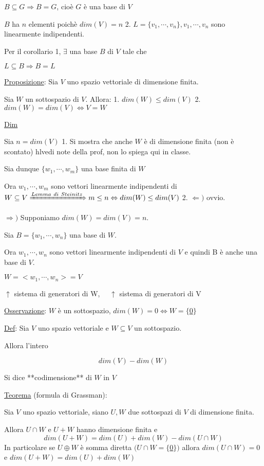 \documentclass{article}
\begin{document}
    $B\subseteq G\Rightarrow B=G$, cioè $G$ è una base di $V$

    $B$ ha $n$ elementi poichè $dim(V)=n$
2. $L=\{v_1,\cdots,v_n\},v_1,\cdots,v_n$ sono linearmente indipendenti.

    Per il corollario 1, $\exists$ una base $B$ di $V$ tale che

    $L\subseteq B\Rightarrow B=L$

\ul{Proposizione}: Sia $V$ uno spazio vettoriale di dimensione finita.

Sia $W$ un sottospazio di $V$. Allora:
1. $dim(W)\le dim(V)$
2. $dim(W)=dim(V)\Leftrightarrow V=W$

\ul{Dim}

Sia $n=dim(V)$
1. Si mostra che anche $W$ è di dimensione finita (non è scontato) hl{vedi note della prof, non lo spiega qui in classe}.

    Sia dunque $\{w_1,\cdots,w_m\}$ una base finita di $W$

    Ora $w_1,\cdots,w_m$ sono vettori linearmente indipendenti di $W\subseteq V\xRightarrow{Lemma\ di\ Steinitz}m\le n\Leftrightarrow dim(W)\le dim(V)$
2. $\Leftarrow)$ ovvio.

    $\Rightarrow)$ Supponiamo $dim(W)=dim(V)=n$.

    Sia $B=\{w_1,\cdots,w_n\}$ una base di $W$.

    Ora $w_1,\cdots,w_n$ sono vettori linearmente indipendenti di $V$ e quindi B è anche una base di $V$.

    $W=<w_1,\cdots,w_n>=V$

    $\uparrow$ sistema di generatori di W, $\quad\uparrow$ sistema di generatori di V

\ul{Osservazione}: $W$ è un sottospazio, $dim(W)=0\Leftrightarrow W=\{$\ul{0}$\}$

\ul{Def}: Sia $V$ uno spazio vettoriale e $W\subseteq V$ un sottospazio.

Allora l'intero

$$dim(V)-dim(W)$$

Si dice **codimensione** di $W$ in $V$

\ul{Teorema} (formula di Grassman):

Sia $V$ uno spazio vettoriale, siano $U,W$ due sottospazi di $V$ di dimensione finita.

Allora $U\cap W$ e $U+W$ hanno dimensione finita e
$$dim(U+W)=dim(U)+dim(W)-dim(U\cap W)$$
In particolare se $U\oplus W$ è somma diretta $(U\cap W=\{$\ul{0}$\})$ allora $dim(U\cap W)=0$ e $dim(U+W)=dim(U)+dim(W)$
\end{document}
